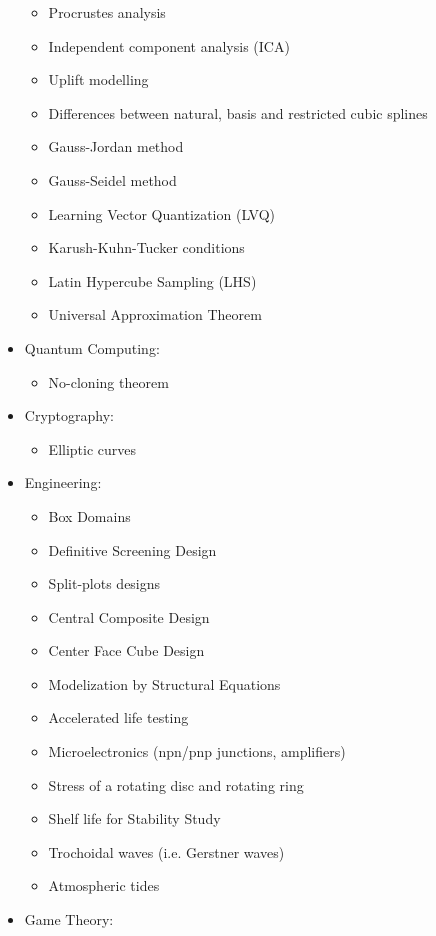 \begin{itemize}
\begin{itemize}
				\item Procrustes analysis
				\item Independent component analysis (ICA)
				\item Uplift modelling
				\item Differences between natural, basis and restricted cubic splines
				\item Gauss-Jordan method
				\item Gauss-Seidel method
				\item Learning Vector Quantization (LVQ)
				\item Karush-Kuhn-Tucker conditions
				\item Latin Hypercube Sampling (LHS)
				\item Universal Approximation Theorem
			\end{itemize}
		\item Quantum Computing: 
			\begin{itemize}
				\item No-cloning theorem
			\end{itemize}
		\item Cryptography: 
			\begin{itemize}
				\item Elliptic curves
			\end{itemize}	
		\item Engineering:
			\begin{itemize}
				\item Box Domains
				\item Definitive Screening Design
				\item Split-plots designs				
				\item Central Composite Design
				\item Center Face Cube Design
				\item Modelization by Structural Equations				
				\item Accelerated life testing
				\item Microelectronics (npn/pnp junctions, amplifiers)
				\item Stress of a rotating disc and rotating ring
				\item Shelf life for Stability Study
				\item Trochoidal waves (i.e. Gerstner waves)
				\item Atmospheric tides
			\end{itemize} 
		\item Game Theory: 
			\begin{itemize}

\end{itemize}
\end{itemize}
